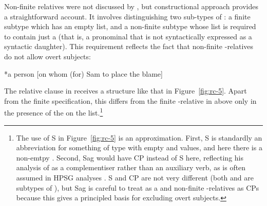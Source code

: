 \documentclass[output=paper,nonflat,draftmode]{./langsci/langscibook}
\begin{document}
Non-finite relatives were not discussed by \cite{Pollard:Sag:94}, but 
constructional approach provides a straightforward account. It involves
distinguishing two sub-types of : a finite subtype which has an empty
 list, and a non-finite subtype whose  list is required to contain
just a  (that is, a pronominal that is not syntactically expressed as a
syntactic daughter). This requirement reflects the fact that non-finite
-relatives do not allow overt subjects:
\begin{exe}\ex\label{x:rc-54}
  *a person [on whom (for) Sam to place the blame]  
\end{exe}
The relative clause in  receives a structure like that in
Figure~\ref{fig:rc-5}. Apart from the finite specification, this differs from the finite
-relative in  above only in the presence of the  on the
 list.\footnote{The use of S in Figure~\ref{fig:rc-5} is an
  approximation. First, S is standardly an abbreviation for something of type
   with empty  and  values,
  and here there is a non-emtpy . Second, Sag would have CP instead of S here,
  reflecting his analysis of  as a complementiser rather than an auxiliary verb,
  as is often assumed in HPSG analyses \citep[e.g.][51--52]{Ginzburg:Sag:00}. S and CP are
  not very different (both  and  are
  subtypes of ), but Sag is careful to treat  as a
   and non-finite -relatives as CPs because this gives a
  principled basis for excluding overt subjects.}
\end{document}
